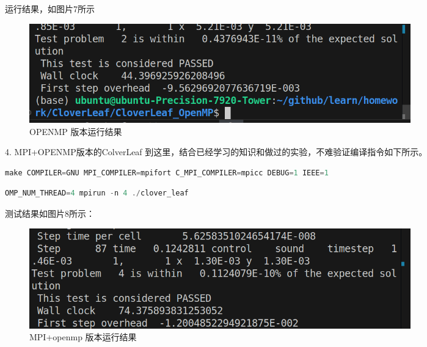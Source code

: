 \documentclass{article}
\begin{document}
\begin{CJK}{UTF8}{gbsn}
    运行结果，如图片7所示
    \begin{figure}[H]
        \centering
        \includegraphics[width=0.8\textwidth]{./OPENMP3.png}
        \caption{OPENMP 版本运行结果}
    \end{figure}

4. MPI+OPENMP版本的ColverLeaf
到这里，结合已经学习的知识和做过的实验，不难验证编译指令如下所示。
\begin{lstlisting}[language=C++]
    make COMPILER=GNU MPI_COMPILER=mpifort C_MPI_COMPILER=mpicc DEBUG=1 IEEE=1
\end{lstlisting} 
\begin{lstlisting}[language=C++]
    OMP_NUM_THREAD=4 mpirun -n 4 ./clover_leaf
\end{lstlisting} 
测试结果如图片8所示：
\begin{figure}[H]
    \centering
    \includegraphics[width=0.8\textwidth]{./ref1.png}
    \caption{MPI+openmp 版本运行结果}
\end{figure}

\end{CJK}
\end{document}
